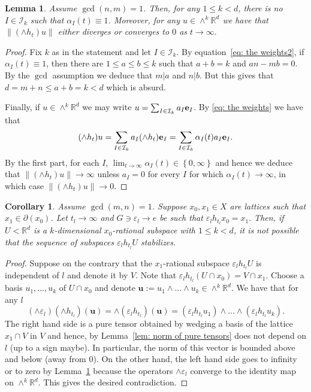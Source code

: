 \documentclass[reqno,11pt, twoside]{amsart}
\theoremstyle{plain}
\newtheorem{lem}[thm]{Lemma}
\newtheorem{cor}[thm]{Corollary}
\theoremstyle{definition}
\theoremstyle{definition}
\theoremstyle{remark}
\numberwithin{equation}{section}
\newcommand{\ve}{{\bf e}}
\newcommand{\al}{\alpha}
\newcommand{\cI}{\mathcal{I}}
\newcommand{\bR}{\mathbb{R}}
\newcommand\norm[1]{\|#1\|}
\newcommand\seta[1]{\left\{#1\right\}}
\newcommand\mb[1]{\mathbf{#1}}
\begin{document}
\begin{lem}\label{lemma: zero is not a weight}
    Assume $\gcd(n,m)=1$. Then, for any $1\le k<d$, there is no $I\in \cI_k$ 
    such that $\al_I(t)\equiv 1$. Moreover, 
    for any $u\in \wedge^k \bR^d$ we have that $\norm{(\wedge h_t)u}$ either diverges or converges to $0$ as $t\to\infty.$
\end{lem}
\begin{proof}
    Fix $k$ as in the statement and let $I\in \cI_k$. By equation~\eqref{eq: the weights2}, if 
     $\al_I(t)\equiv 1$, then there are $1\le a \le b\le k$ such that $a+b=k$ and $an-mb=0$. By the $\gcd$ assumption we deduce that $m|a$ and $n|b$. But this gives that  $d=  m+n\le a+b=k<d $ which is absurd.

    Finally, if $u\in \wedge^k \bR^d$ we may write $u=\sum_{I\in \cI_k} a_I\ve_I$. By \eqref{eq: the weights} we have that 
    $$(\wedge h_t)u = \sum_{I\in \cI_k} a_I (\wedge h_t)\ve_I = 
    \sum_{I\in\cI_k} \al_I(t)a_I \ve_I.$$
    By the first part, for each $I$, $\lim_{t\to\infty} \al_I(t)\in \seta{0,\infty}$ and hence we deduce that $\norm{(\wedge h_t)u}\to \infty$  unless $a_I=0$ for every $I$ for which $\al_I(t)\to \infty$, in which case $\norm{(\wedge h_t)u}\to 0$.
    
\end{proof}
\begin{cor}\label{cor: subspaces do not stabilize}
    Assume $\gcd(m,n)=1$. 
    Suppose $x_0,x_1\in X$ are lattices such that $x_1\in \partial(x_0)$. Let
    $t_l\to\infty$ and $G\ni \varepsilon_l\to e$ be such that $\varepsilon_l h_{t_l}x_0=x_1.$ Then, if
    $U<\bR^d$ is a $k$-dimensional
    $x_0$-rational subspace with $1\le k <d$, it is not possible that the sequence of subspaces $\varepsilon_l h_{t_l} U$ stabilizes. 
\end{cor}
    \begin{proof}
        Suppose on the contrary that the $x_1$-rational subspace 
        $\varepsilon_l h_{t_l} U$ is independent of $l$ and denote it by $V$. 
        Note that $\varepsilon_lh_{t_l}(U\cap x_0) = V\cap x_1$. 
        Choose a basis
        $u_1,\dots, u_k$ of $U\cap x_0$ and denote $\mb{u}:=u_1\wedge\dots \wedge u_k\in \wedge^k\bR^d$. We have that for any $l$ 
        $$(\wedge \varepsilon_l)(\wedge h_{t_l}) (\mb{u}) = \wedge(\varepsilon_l h_{t_l})(\mb{u}) =(\varepsilon_l h_{t_l} u_1)\wedge\dots \wedge(\varepsilon_l h_{t_l}u_k). $$
        The right hand side is a pure tensor obtained by wedging a basis of the lattice $x_1\cap V$ in $V$ and hence, by Lemma~\ref{lem: norm of pure tensors} does not depend on $l$ (up to a sign maybe). In particular, the norm of this vector is bounded
        above and below (away from $0$). On the other hand, the left hand side goes to infinity or to zero by Lemma~\ref{lemma: zero is not a weight} because the operators $\wedge \varepsilon_l$ converge to the identity map on $\wedge^k\bR^d$. This gives the desired contradiction.
    \end{proof}
\end{document}
